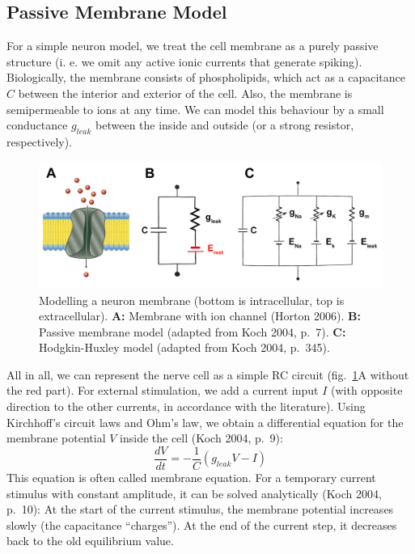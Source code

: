 \documentclass[12pt,a4paper,]{report}
\begin{document}
\subsection{Passive Membrane Model}\label{passive-membrane-model}

For a simple neuron model, we treat the cell membrane as a purely
passive structure (i. e. we omit any active ionic currents that generate
spiking). Biologically, the membrane consists of phospholipids, which
act as a capacitance $C$ between the interior and exterior of the cell.
Also, the membrane is semipermeable to ions at any time. We can model
this behaviour by a small conductance $g_{leak}$ between the inside and
outside (or a strong resistor, respectively).

\begin{figure}
\centering
\includegraphics[]{images/circuits.png}
\caption[Modelling a neuron membrane]{Modelling a neuron membrane (bottom is intracellular, top
is extracellular). \textbf{A:} Membrane with ion channel (Horton 2006).
\textbf{B:} Passive membrane model (adapted from Koch 2004, p.~7).
\textbf{C:} Hodgkin-Huxley model (adapted from Koch 2004,
p.~345).}\label{circuits}
\end{figure}

All in all, we can represent the nerve cell as a simple RC circuit
(fig.~\ref{circuits}A without the red part). For external stimulation,
we add a current input $I$ (with opposite direction to the other
currents, in accordance with the literature). Using Kirchhoff's circuit
laws and Ohm's law, we obtain a differential equation for the membrane
potential $V$ inside the cell (Koch 2004, p.~9):
%
\begin{equation}
\label{membrane-equation}
\frac{dV}{dt} = - \frac{1}{C} (g_{leak} V - I)
\end{equation}
%
 This equation is often called membrane equation. For a temporary
current stimulus with constant amplitude, it can be solved analytically
(Koch 2004, p.~10): At the start of the current stimulus, the membrane
potential increases slowly (the capacitance ``charges''). At the end of
the current step, it decreases back to the old equilibrium value.
\end{document}
